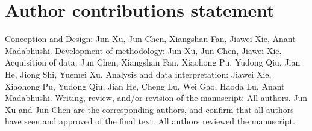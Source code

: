 \documentclass[num-refs]{wiley-article}
\begin{document}
\section*{Author contributions statement}
Conception and Design: Jun Xu, Jun Chen, Xiangshan Fan, Jiawei Xie, Anant Madabhushi. Development of methodology: Jun Xu, Jun Chen, Jiawei Xie.
Acquisition of data: Jun Chen, Xiangshan Fan, Xiaohong Pu, Yudong Qiu, Jian He, Jiong Shi, Yuemei Xu.
Analysis and data interpretation: Jiawei Xie, Xiaohong Pu, Yudong Qiu, Jian He, Cheng Lu, Wei Gao, Haoda Lu, Anant Madabhushi. Writing, review, and/or revision of the manuscript: All authors. Jun Xu and Jun Chen are the corresponding authors, and confirm that all authors have seen and approved of the final text. All authors reviewed the manuscript. 

\printendnotes




\end{document}
